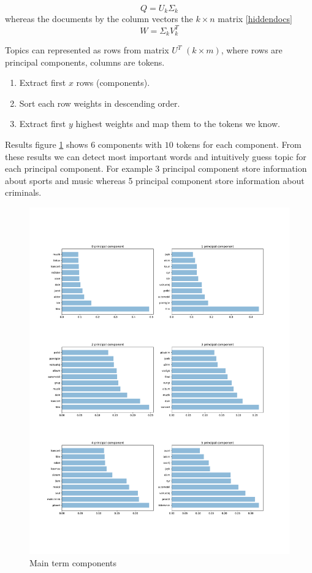 \documentclass{article}
\begin{document}
\begin{equation}
\label{hiddenterms}
Q = U_k\Sigma_k
\end{equation}
whereas the documents by the column vectors the $k \times n$ matrix \ref{hiddendocs}
 \begin{equation}
\label{hiddendocs}
W =\Sigma_kV_k^T
\end{equation}

Topics can represented as rows from matrix $U^T$ $(k \times m)$, where rows are principal components, columns are tokens. 
\begin{enumerate}
\item Extract first $x$ rows (components).
\item Sort each row weights in descending order.
\item Extract first $y$ highest weights and map them to the tokens we know.
\end{enumerate}


 Results figure \ref{main_terms_components} shows $6$ components with $10$ tokens for each component. From these results we can detect most important words and intuitively guess topic for each principal component. For example 3 principal component store information about  sports and music whereas 5 principal component store information about criminals.


\begin{figure}[H]
  \centering
  \includegraphics[scale=0.4]{images/main_term_components.pdf}
  \caption{Main term components}
  \label{main_terms_components}
\end{figure}
\end{document}
